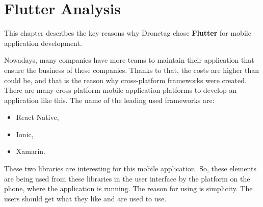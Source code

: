 \chapter{Flutter Analysis}\label{ch:flutter-analysis}

This chapter describes the key reasons why Dronetag chose \textbf{Flutter} for mobile application development.

Nowadays, many companies have more teams to maintain their application that ensure the business of these companies.
Thanks to that, the costs are higher than could be, and that is the reason why cross-platform frameworks were created.
There are many cross-platform mobile application platforms to develop an application like this.
The name of the leading used frameworks are:
\begin{itemize}
    \item React Native,
    \item Ionic,
    \item Xamarin.
\end{itemize}
















These two libraries are interesting for this mobile application.
So, these elements are being used from these libraries in the user interface by the platform on the phone, where the application is running.
The reason for using is simplicity.
The users should get what they like and are used to use.
